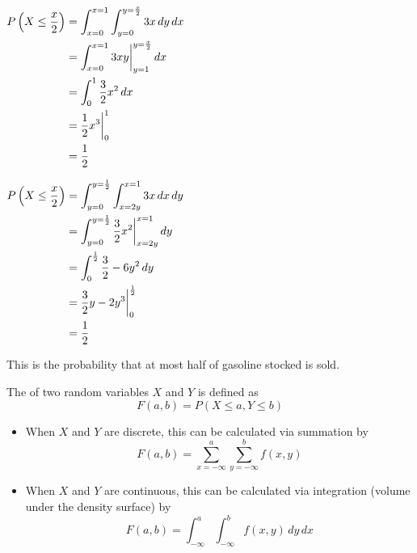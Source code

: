 \begin{example}
\begin{enumerate}[label=\alph*)]
        \begin{minipage}[t]{0.45\linewidth}
            $\begin{aligned}[t]
                P\left(X \le \frac{x}{2}\right) & = \int_{x=0}^{x=1} \int_{y=0}^{y=\frac{x}{2}} 3x \,dy \,dx \\
                                             & = \int_{x=0}^{x=1} 3xy \bigg|_{y=1}^{y=\frac{x}{2}} \,dx   \\
                                             & = \int_0^1 \frac{3}{2}x^2 \,dx                             \\
                                             & = \frac{1}{2} x^3 \bigg|_0^1                               \\
                                             & = \frac{1}{2}
            \end{aligned}$
        \end{minipage}
        \begin{minipage}[t]{0.45\linewidth}
            $\begin{aligned}[t]
                P\left(X \le \frac{x}{2}\right) & = \int_{y=0}^{y=\frac{1}{2}} \int_{x=2y}^{x=1} 3x \,dx \,dy          \\
                                             & = \int_{y=0}^{y=\frac{1}{2}} \frac{3}{2}x^2 \bigg|_{x=2y}^{x=1} \,dy \\
                                             & = \int_0^{\frac{1}{2}} \frac{3}{2} - 6y^2 \,dy                       \\
                                             & = \frac{3}{2}y - 2y^3 \bigg|_0^{\frac{1}{2}}                         \\
                                             & = \frac{1}{2}
            \end{aligned}$
        \end{minipage}

        This is the probability that at most half of gasoline stocked is sold. 
    \end{enumerate}
\end{example}

\begin{definition}
    The  of two random variables $X$ and $Y$ is defined as $$F(a, b) = P(X \le a, Y \le b)$$

    \begin{itemize}
        \item When $X$ and $Y$ are discrete, this can be calculated via summation by $$F(a, b) = \sum_{x=-\infty}^a \sum_{y=-\infty}^b f(x, y)$$
        \item When $X$ and $Y$ are continuous, this can be calculated via integration (volume under the density surface) by $$F(a, b) = \int_{-\infty}^a \int_{-\infty}^b f(x, y) \,dy \,dx$$
    \end{itemize}
\end{definition}

